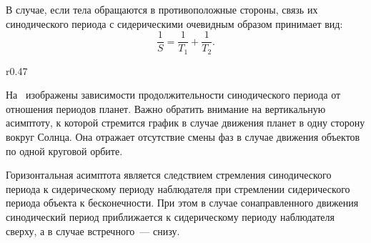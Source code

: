 В случае, если тела обращаются в противоположные стороны, связь
их синодического периода с сидерическими очевидным образом принимает вид:
\begin{equation}
	\frac{1}{S} = \frac{1}{T_1} + \frac{1}{T_2}.
\end{equation}

\begin{wrapfigure}[14]{r}{0.47\tw}
    \centering
    \vspace{-1pc}
	\caption{}
	\label{pic:sinodic-period-plot}    
\end{wrapfigure} 
На~ изображены зависимости продолжительности синодического периода от отношения периодов планет. Важно обратить внимание на вертикальную асимптоту, к которой стремится график в случае движения планет в одну сторону вокруг Солнца. Она отражает отсутствие смены фаз в случае движения объектов по одной круговой орбите.

Горизонтальная асимптота является следствием стремления синодического периода к сидерическому периоду наблюдателя при стремлении сидерического периода объекта к бесконечности. При этом в случае сонаправленного движения синодический период приближается к сидерическому периоду наблюдателя сверху, а в случае встречного~--- снизу.

